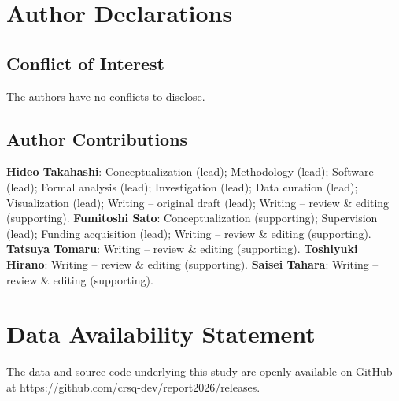 \documentclass[aip, adv, amsmath, amssymb, reprint]{revtex4-1}
\begin{document}
\section*{Author Declarations}
\subsection*{Conflict of Interest}
The authors have no conflicts to disclose.
\subsection*{Author Contributions}
\textbf{Hideo Takahashi}: Conceptualization (lead); Methodology (lead); Software
(lead); Formal analysis (lead); Investigation (lead); Data curation (lead);
Visualization (lead); Writing -- original draft (lead); Writing -- review \&
editing (supporting). \textbf{Fumitoshi Sato}: Conceptualization (supporting);
Supervision (lead); Funding acquisition (lead); Writing -- review \& editing
(supporting). \textbf{Tatsuya Tomaru}: Writing -- review \& editing
(supporting). \textbf{Toshiyuki Hirano}: Writing -- review \& editing
(supporting). \textbf{Saisei Tahara}: Writing -- review \& editing (supporting).

\section*{Data Availability Statement}

The data and source code underlying this study are openly available on GitHub at https://github.com/crsq-dev/report2026/releases.




\end{document}
